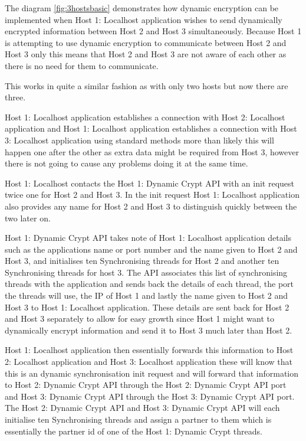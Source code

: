 \FloatBarrier

The diagram \ref{fig:3hostsbasic} demonstrates how dynamic encryption can be implemented when Host 1: Localhost application wishes to send dynamically encrypted information between Host 2 and Host 3 simultaneously. Because Host 1 is attempting to use dynamic encryption to communicate between Host 2 and Host 3 only this means that Host 2 and Host 3 are not aware of each other as there is no need for them to communicate.

This works in quite a similar fashion as with only two hosts but now there are three.

Host 1: Localhost application establishes a connection with Host 2: Localhost application and Host 1: Localhost application establishes a connection with Host 3: Localhost application using standard methods more than likely this will happen one after the other as extra data might be required from Host 3, however there is not going to cause any problems doing it at the same time. 

Host 1: Localhost contacts the Host 1: Dynamic Crypt API with an init request twice one for Host 2 and Host 3. In the init request Host 1: Localhost application also provides any name for Host 2 and Host 3 to distinguish quickly between the two later on.

Host 1: Dynamic Crypt API takes note of Host 1: Localhost application details such as the applications name or port number and the name given to Host 2 and Host 3, and initialises ten Synchronising threads for Host 2 and another ten Synchronising threads for host 3. The API associates this list of synchronising threads with the application and sends back the details of each thread, the port the threads will use, the IP of Host 1 and lastly the name given to Host 2 and Host 3 to Host 1: Localhost application. These details are sent back for Host 2 and Host 3 separately to allow for easy growth since Host 1 might want to dynamically encrypt information and send it to Host 3 much later than Host 2.

Host 1: Localhost application then essentially forwards this information to Host 2: Localhost application and Host 3: Localhost application these will know that this is an dynamic synchronisation init request and will forward that information to Host 2: Dynamic Crypt API through the Host 2: Dynamic Crypt API port and Host 3: Dynamic Crypt API through the Host 3: Dynamic Crypt API port. The Host 2: Dynamic Crypt API and Host 3: Dynamic Crypt API will each initialise ten Synchronising threads and assign a partner to them which is essentially the partner id of one of the Host 1: Dynamic Crypt threads.

